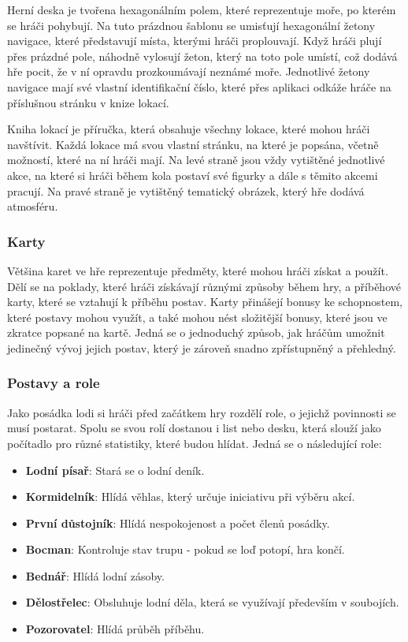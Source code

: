 Herní deska je tvořena hexagonálním polem, které reprezentuje moře, po kterém se hráči pohybují. Na tuto prázdnou šablonu se umisťují hexagonální žetony navigace, které představují místa, kterými hráči proplouvají. Když hráči plují přes prázdné pole, náhodně vylosují žeton, který na toto pole umístí, což dodává hře pocit, že v ní opravdu prozkoumávají neznámé moře. Jednotlivé žetony navigace mají své vlastní identifikační číslo, které přes aplikaci odkáže hráče na příslušnou stránku v knize lokací.

Kniha lokací je příručka, která obsahuje všechny lokace, které mohou hráči navštívit. Každá lokace má svou vlastní stránku, na které je popsána, včetně možností, které na ní hráči mají. Na levé straně jsou vždy vytištěné jednotlivé akce, na které si hráči během kola postaví své figurky a dále s těmito akcemi pracují. Na pravé straně je vytištěný tematický obrázek, který hře dodává atmosféru.

\subsubsection*{Karty}
\label{subsubsec:fw_comp_cards}

Většina karet ve hře reprezentuje předměty, které mohou hráči získat a použít. Dělí se na poklady, které hráči získávají různými způsoby během hry, a příběhové karty, které se vztahují k příběhu postav. Karty přinášejí bonusy ke schopnostem, které postavy mohou využít, a také mohou nést složitější bonusy, které jsou ve zkratce popsané na kartě. Jedná se o jednoduchý způsob, jak hráčům umožnit jedinečný vývoj jejich postav, který je zároveň snadno zpřístupněný a přehledný.

\subsubsection*{Postavy a role}
\label{subsubsec:fw_comp_roles}

Jako posádka lodi si hráči před začátkem hry rozdělí role, o jejichž povinnosti se musí postarat. Spolu se svou rolí dostanou i list nebo desku, která slouží jako počítadlo pro různé statistiky, které budou hlídat. Jedná se o následující role:

\begin{itemize}
    \item \textbf{Lodní písař}: Stará se o lodní deník.
    \item \textbf{Kormidelník}: Hlídá věhlas, který určuje iniciativu při výběru akcí.
    \item \textbf{První důstojník}: Hlídá nespokojenost a počet členů posádky.
    \item \textbf{Bocman}: Kontroluje stav trupu - pokud se loď potopí, hra končí.
    \item \textbf{Bednář}: Hlídá lodní zásoby.
    \item \textbf{Dělostřelec}: Obsluhuje lodní děla, která se využívají především v soubojích.
    \item \textbf{Pozorovatel}: Hlídá průběh příběhu.
\end{itemize}

